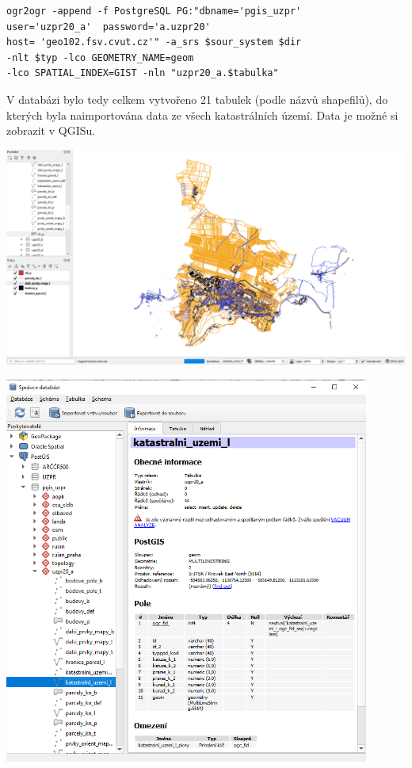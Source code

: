 \documentclass[12pt]{article}
\begin{document}
\begin{lstlisting}
ogr2ogr -append -f PostgreSQL PG:"dbname='pgis_uzpr' 
user='uzpr20_a'  password='a.uzpr20' 
host= 'geo102.fsv.cvut.cz'" -a_srs $sour_system $dir 
-nlt $typ -lco GEOMETRY_NAME=geom 
-lco SPATIAL_INDEX=GIST -nln "uzpr20_a.$tabulka"
\end{lstlisting}

V databázi bylo tedy celkem vytvořeno 21 tabulek (podle názvů shapefilů), do kterých byla naimportována data ze všech katastrálních území. Data je možné si zobrazit v QGISu.

\begin{center}
	\includegraphics[width=15cm]{./img/qgis_data.png}
\end{center}

\begin{center}
	\includegraphics[width=12cm]{./img/qgis_spravce_db_ku.png}
\end{center}
\end{document}
